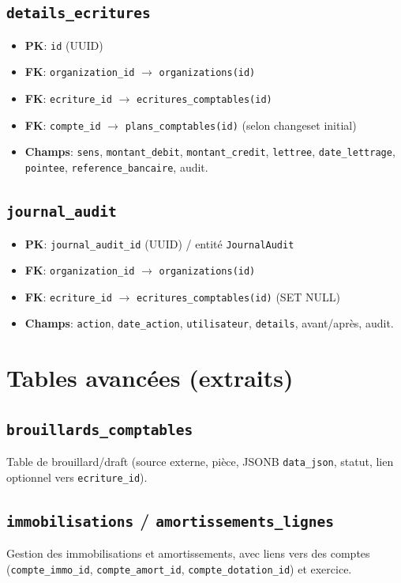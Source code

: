 \subsection{\texttt{details\_ecritures}}
\begin{itemize}
  \item \textbf{PK}: \texttt{id} (UUID)
  \item \textbf{FK}: \texttt{organization\_id} \(\rightarrow\) \texttt{organizations(id)}
  \item \textbf{FK}: \texttt{ecriture\_id} \(\rightarrow\) \texttt{ecritures\_comptables(id)}
  \item \textbf{FK}: \texttt{compte\_id} \(\rightarrow\) \texttt{plans\_comptables(id)} (selon changeset initial)
  \item \textbf{Champs}: \texttt{sens}, \texttt{montant\_debit}, \texttt{montant\_credit}, \texttt{lettree}, \texttt{date\_lettrage}, \texttt{pointee}, \texttt{reference\_bancaire}, audit.
\end{itemize}

\subsection{\texttt{journal\_audit}}
\begin{itemize}
  \item \textbf{PK}: \texttt{journal\_audit\_id} (UUID) / entité \texttt{JournalAudit}
  \item \textbf{FK}: \texttt{organization\_id} \(\rightarrow\) \texttt{organizations(id)}
  \item \textbf{FK}: \texttt{ecriture\_id} \(\rightarrow\) \texttt{ecritures\_comptables(id)} (SET NULL)
  \item \textbf{Champs}: \texttt{action}, \texttt{date\_action}, \texttt{utilisateur}, \texttt{details}, avant/après, audit.
\end{itemize}

\section{Tables avancées (extraits)}
\subsection{\texttt{brouillards\_comptables}}
Table de brouillard/draft (source externe, pièce, JSONB \texttt{data\_json}, statut, lien optionnel vers \texttt{ecriture\_id}).

\subsection{\texttt{immobilisations} / \texttt{amortissements\_lignes}}
Gestion des immobilisations et amortissements, avec liens vers des comptes (\texttt{compte\_immo\_id}, \texttt{compte\_amort\_id}, \texttt{compte\_dotation\_id}) et exercice.

